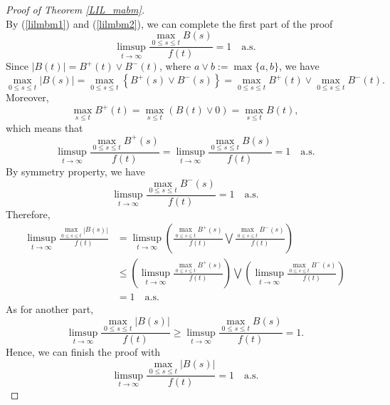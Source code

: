 \documentclass[main.tex]{subfiles}
\begin{document}
\begin{proof}[Proof of Theorem \ref{LIL_mabm}]
\begin{equation}
\end{equation}
By (\ref{lilmbm1}) and (\ref{lilmbm2}), we can complete the first part of the proof
$$\limsup\limits_{t\to\infty}\frac{\max\limits_{0\leqslant s\leqslant t}B(s)}{f(t)}=1\quad\mathrm{a.s.}$$
Since $|B(t)|=B^+(t)\vee B^-(t)$, where $a \vee b:=\max\{a,b\}$, we have
$$\max\limits_{0\leqslant s\leqslant t}|B(s)|=\max\limits_{0\leqslant s\leqslant t}\left\{B^+(s)\vee B^-(s)\right\}=\max\limits_{0\leqslant s\leqslant t}B^+(t)\vee\max\limits_{0\leqslant s\leqslant t}B^-(t).$$
Moreover,  
$$\max\limits_{s\leqslant t} B^+(t)=\max\limits_{s\leqslant t} (B(t)\vee 0)=\max\limits_{s\leqslant t} B(t),$$
which means that
$$\limsup\limits_{t\to\infty}\frac{\max\limits_{0\leqslant s\leqslant t}B^+(s)}{f(t)}=\limsup\limits_{t\to\infty}\frac{\max\limits_{0\leqslant s\leqslant t}B(s)}{f(t)}=1\quad\mathrm{a.s.}$$
By symmetry property, we have
$$\limsup\limits_{t\to\infty}\frac{\max\limits_{0\leqslant s\leqslant t}B^-(s)}{f(t)}=1\quad\mathrm{a.s.}$$
Therefore, 
\begin{align*}
	\limsup\limits_{t\to\infty}\frac{\max\limits_{0\leqslant s\leqslant t}|B(s)|}{f(t)}
	&=\limsup\limits_{t\to\infty}\left(\frac{\max\limits_{0\leqslant s\leqslant t}B^+(s)}{f(t)}\bigvee\frac{\max\limits_{0\leqslant s\leqslant t}B^-(s)}{f(t)}\right)\\
	&\leqslant \left(\limsup\limits_{t\to\infty}\frac{\max\limits_{0\leqslant s\leqslant t}B^+(s)}{f(t)}\right)\bigvee\left(\limsup\limits_{t\to\infty}\frac{\max\limits_{0\leqslant s\leqslant t}B^-(s)}{f(t)}\right)\\
	&=1\quad\mathrm{a.s.}
\end{align*}
As for another part,
$$\limsup\limits_{t\to\infty}\frac{\max\limits_{0\leqslant s\leqslant t}|B(s)|}{f(t)}\geqslant\limsup\limits_{t\to\infty}\frac{\max\limits_{0\leqslant s\leqslant t}B(s)}{f(t)}=1.$$
Hence, we can finish the proof with
$$\limsup\limits_{t\to\infty}\frac{\max\limits_{0\leqslant s\leqslant t}|B(s)|}{f(t)}=1\quad\mathrm{a.s.}$$
\end{proof}
\end{document}
